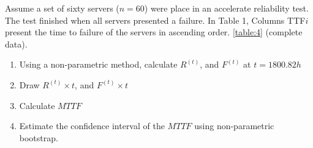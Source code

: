 \documentclass{article}
\begin{document}

\setcounter{Question}{2}
\begin{question}
Assume a set of sixty servers ($n = 60$) were place in an accelerate reliability test. The test finished when all servers
presented a failure. In Table 1, Columns TTF$i$ present the time to failure of the servers in ascending order.
\ref{table:4} (complete data).
    \begin{enumerate}[label=(\alph*)]
        \item Using a non-parametric method, calculate $R^(t)$, and $F^(t)$ at $t = 1800.82h$
        \item  Draw $R^(t) \times t$, and $F^(t) \times t$
        \item  Calculate $MTTF$
        \item Estimate the confidence interval of the $MTTF$ using non-parametric bootstrap.
    \end{enumerate}
    
\end{question}
\end{document}
